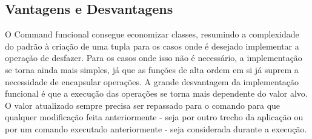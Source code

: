 \subsection*{Vantagens e Desvantagens}

O Command funcional consegue economizar classes, resumindo a 
complexidade do padrão à criação de uma tupla para os casos 
onde é desejado implementar a operação de desfazer. Para 
os casos onde isso não é necessário, a implementação se torna 
ainda mais simples, já que as funções de alta ordem em si 
já suprem a necessidade de encapsular operações. A grande 
desvantagem da implementação funcional é que a execução das 
operações se torna mais dependente do valor alvo. O valor 
atualizado sempre precisa ser repassado para o comando para 
que qualquer modificação feita anteriormente - seja por outro 
trecho da aplicação ou por um comando executado anteriormente - 
seja considerada durante a execução.